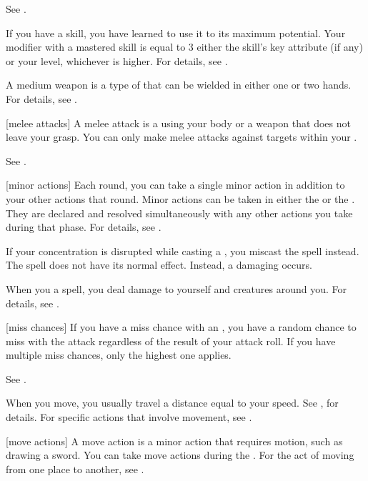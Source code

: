  See .

 If you have  a skill, you have learned to use it to its maximum potential.
Your modifier with a mastered skill is equal to 3 \add either the skill's key attribute (if any) or your level, whichever is higher.
For details, see .

 A medium weapon is a type of  that can be wielded in either one or two hands.
For details, see .

[melee attacks] A melee attack is a  using your body or a weapon that does not leave your grasp.
You can only make melee attacks against targets within your .

 See .

[minor actions] Each round, you can take a single minor action in addition to your other actions that round.
Minor actions can be taken in either the  or the .
They are declared and resolved simultaneously with any other actions you take during that phase.
For details, see .

 If your concentration is disrupted while casting a , you miscast the spell instead.
The spell does not have its normal effect.
Instead, a damaging  occurs.

 When you  a spell, you deal damage to yourself and creatures around you.
For details, see .

[miss chances] If you have a miss chance with an , you have a random chance to miss with the attack regardless of the result of your attack roll.
If you have multiple miss chances, only the highest one applies.

 See .

 When you move, you usually travel a distance equal to your speed.
See , for details.
For specific actions that involve movement, see .

[move actions] A move action is a minor action that requires motion, such as drawing a sword.
You can take move actions during the .
For the act of moving from one place to another, see .

